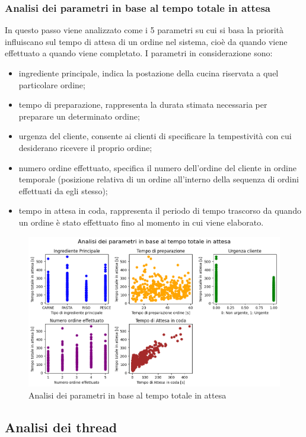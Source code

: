 \subsubsection{Analisi dei parametri in base al tempo totale in attesa}
In questo passo viene analizzato come i 5 parametri su cui si basa la priorità influiscano sul tempo di attesa di un ordine nel sistema, cioè da quando viene effettuato a quando viene completato. I parametri in considerazione sono:
\begin{itemize}
	\item ingrediente principale, indica la postazione della cucina riservata a quel particolare ordine;
	\item tempo di preparazione, rappresenta la durata stimata necessaria per preparare un determinato ordine;
	\item urgenza del cliente, consente ai clienti di specificare la tempestività con cui desiderano ricevere il proprio ordine;
	\item numero ordine effettuato, specifica il numero dell’ordine del cliente in ordine temporale (posizione relativa di un ordine all’interno della sequenza di ordini effettuati da egli stesso);
	\item tempo in attesa in coda, rappresenta il periodo di tempo trascorso da quando un ordine è stato effettuato fino al momento in cui viene elaborato.
\end{itemize}
\begin{figure}[H]
	\centering
	\includegraphics[scale=0.6]{iterazione3/images/analisi_parametri.png}
	\caption{Analisi dei parametri in base al tempo totale in attesa\label{fig:analisi_parametri}}
\end{figure}

\subsection{Analisi dei thread}

\clearpage